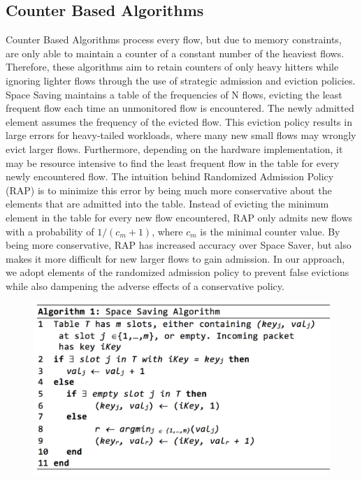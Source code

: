 \subsection{Counter Based Algorithms}
Counter Based Algorithms process every flow, but due to memory constraints, are only able to maintain a counter of a constant number of the heaviest flows. Therefore, these algorithms aim to retain counters of only heavy hitters while ignoring lighter flows through the use of strategic admission and eviction policies. Space Saving maintains a table of the frequencies of N flows, evicting the least frequent flow each time an unmonitored flow is encountered. The newly admitted element assumes the frequency of the evicted flow. This eviction policy results in large errors for heavy-tailed workloads, where many new small flows may wrongly evict larger flows. Furthermore, depending on the hardware implementation, it may be resource intensive to find the least frequent flow in the table for every newly encountered flow. 
The intuition behind Randomized Admission Policy (RAP) is to minimize this error by being much more conservative about the elements that are admitted into the table. Instead of evicting the minimum element in the table for every new flow encountered, RAP only admits new flows with a probability of $1/(c_m + 1)$, where $c_m$ is the minimal counter value. By being more conservative, RAP has increased accuracy over Space Saver, but also makes it more difficult for new larger flows to gain admission. In our approach, we adopt elements of the randomized admission policy to prevent false evictions while also dampening the adverse effects of a conservative policy. 

\begin{figure}[t]
  \centering
    \includegraphics[scale=0.5]{alg1}
     \label{fig:bp-image}
\end{figure}

